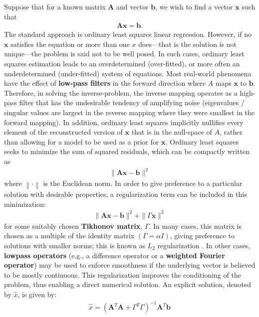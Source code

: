 Suppose that for a known matrix $\bm A$ and vector $\bm b$, we wish to find a vector $\bm {x}$ such that
\begin{align}
   \bm A\bm {x} =\bm {b}.
\end{align}
The standard approach is ordinary least squares linear regression. However, if no $\bm x$ satisfies the equation or more than one $\displaystyle x$ does—that is the solution is not unique—the problem is said not to be well posed. In such cases, ordinary least squares estimation leads to an overdetermined (over-fitted), or more often an underdetermined (under-fitted) system of equations. Most real-world phenomena have the effect of \textbf{low-pass filters} in the forward direction where $\displaystyle A$ maps $ \bm {x}$ to $ \bm {b}$. Therefore, in solving the inverse-problem, the inverse mapping operates as a high-pass filter that has the undesirable tendency of amplifying noise (eigenvalues / singular values are largest in the reverse mapping where they were smallest in the forward mapping). In addition, ordinary least squares implicitly nullifies every element of the reconstructed version of $\bm {x}$ that is in the null-space of $A$, rather than allowing for a model to be used as a prior for $\bm {x}$. Ordinary least squares seeks to minimize the sum of squared residuals, which can be compactly written as
\begin{align}
   \|\bm A\bm {x} -\bm {b} \|^{2}
\end{align}
where $\left\|\cdot \right\|$ is the Euclidean norm. In order to give preference to a particular solution with desirable properties, a regularization term can be included in this minimization:
\begin{align}
  \|\bm A\bm {x} -\bm {b} \|^{2}+\|\Gamma \bm {x} \|^{2}
\end{align}
for some suitably chosen \textbf{Tikhonov matrix}, $\Gamma$. In many cases, this matrix is chosen as a multiple of the identity matrix $ (\Gamma =\alpha I)$, giving preference to solutions with smaller norms; this is known as $L_2$ regularization \cite{Ng2004-32636}. In other cases, \textbf{lowpass operators} (e.g., a difference operator or a \textbf{weighted Fourier operator}) may be used to enforce smoothness if the underlying vector is believed to be mostly continuous. This regularization improves the conditioning of the problem, thus enabling a direct numerical solution. An explicit solution, denoted by $\hat {x}$, is given by:
\begin{align}
  {\hat {x}}=(\bm A^{T}\bm A+\Gamma ^{T}\Gamma )^{-1}\bm A^{T}\bm {b}
\end{align}

